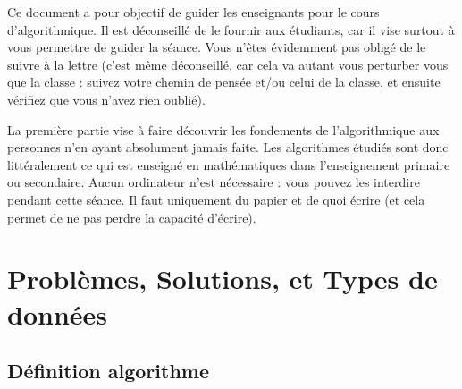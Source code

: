 \documentclass[11pt,a4paper]{article}
\begin{document}
\EncadreTitre

\bigskip


%
%

\bigskip


Ce document a pour objectif de guider les enseignants pour le cours d'algorithmique.
Il est déconseillé de le fournir aux étudiants, car il vise surtout à vous permettre de guider la séance.
Vous n'êtes évidemment pas obligé de le suivre à la lettre (c'est même déconseillé, car cela va autant vous perturber vous que la classe : suivez votre chemin de pensée et/ou celui de la classe, et ensuite vérifiez que vous n'avez rien oublié).

\medskip

La première partie vise à faire découvrir les fondements de l'algorithmique aux personnes n'en ayant absolument jamais faite.
Les algorithmes étudiés sont donc littéralement ce qui est enseigné en mathématiques dans l'enseignement primaire ou secondaire.
Aucun ordinateur n'est nécessaire : vous pouvez les interdire pendant cette séance.
Il faut uniquement du papier et de quoi écrire (et cela permet de ne pas perdre la capacité d'écrire).

\bigskip


\section{Problèmes, Solutions, et Types de données}

\bigskip

\subsection{Définition algorithme}
\end{document}
